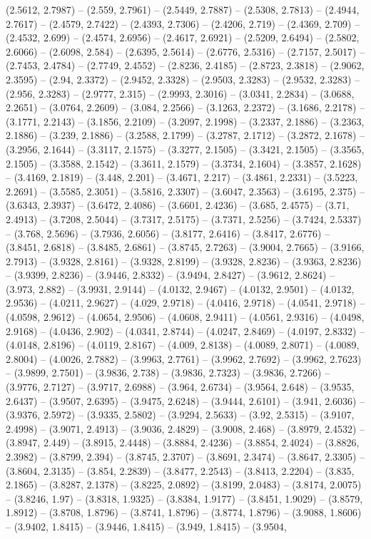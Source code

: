 (2.5612, 2.7987) -- (2.559, 2.7961) -- (2.5449, 2.7887) -- (2.5308, 2.7813) -- (2.4944, 2.7617) -- (2.4579, 2.7422) -- (2.4393, 2.7306) -- (2.4206, 2.719) -- (2.4369, 2.709) -- (2.4532, 2.699) -- (2.4574, 2.6956) -- (2.4617, 2.6921) -- (2.5209, 2.6494) -- (2.5802, 2.6066) -- (2.6098, 2.584) -- (2.6395, 2.5614) -- (2.6776, 2.5316) -- (2.7157, 2.5017) -- (2.7453, 2.4784) -- (2.7749, 2.4552) -- (2.8236, 2.4185) -- (2.8723, 2.3818) -- (2.9062, 2.3595) -- (2.94, 2.3372) -- (2.9452, 2.3328) -- (2.9503, 2.3283) -- (2.9532, 2.3283) -- (2.956, 2.3283) -- (2.9777, 2.315) -- (2.9993, 2.3016) -- (3.0341, 2.2834) -- (3.0688, 2.2651) -- (3.0764, 2.2609) -- (3.084, 2.2566) -- (3.1263, 2.2372) -- (3.1686, 2.2178) -- (3.1771, 2.2143) -- (3.1856, 2.2109) -- (3.2097, 2.1998) -- (3.2337, 2.1886) -- (3.2363, 2.1886) -- (3.239, 2.1886) -- (3.2588, 2.1799) -- (3.2787, 2.1712) -- (3.2872, 2.1678) -- (3.2956, 2.1644) -- (3.3117, 2.1575) -- (3.3277, 2.1505) -- (3.3421, 2.1505) -- (3.3565, 2.1505) -- (3.3588, 2.1542) -- (3.3611, 2.1579) -- (3.3734, 2.1604) -- (3.3857, 2.1628) -- (3.4169, 2.1819) -- (3.448, 2.201) -- (3.4671, 2.217) -- (3.4861, 2.2331) -- (3.5223, 2.2691) -- (3.5585, 2.3051) -- (3.5816, 2.3307) -- (3.6047, 2.3563) -- (3.6195, 2.375) -- (3.6343, 2.3937) -- (3.6472, 2.4086) -- (3.6601, 2.4236) -- (3.685, 2.4575) -- (3.71, 2.4913) -- (3.7208, 2.5044) -- (3.7317, 2.5175) -- (3.7371, 2.5256) -- (3.7424, 2.5337) -- (3.768, 2.5696) -- (3.7936, 2.6056) -- (3.8177, 2.6416) -- (3.8417, 2.6776) -- (3.8451, 2.6818) -- (3.8485, 2.6861) -- (3.8745, 2.7263) -- (3.9004, 2.7665) -- (3.9166, 2.7913) -- (3.9328, 2.8161) -- (3.9328, 2.8199) -- (3.9328, 2.8236) -- (3.9363, 2.8236) -- (3.9399, 2.8236) -- (3.9446, 2.8332) -- (3.9494, 2.8427) -- (3.9612, 2.8624) -- (3.973, 2.882) -- (3.9931, 2.9144) -- (4.0132, 2.9467) -- (4.0132, 2.9501) -- (4.0132, 2.9536) -- (4.0211, 2.9627) -- (4.029, 2.9718) -- (4.0416, 2.9718) -- (4.0541, 2.9718) -- (4.0598, 2.9612) -- (4.0654, 2.9506) -- (4.0608, 2.9411) -- (4.0561, 2.9316) -- (4.0498, 2.9168) -- (4.0436, 2.902) -- (4.0341, 2.8744) -- (4.0247, 2.8469) -- (4.0197, 2.8332) -- (4.0148, 2.8196) -- (4.0119, 2.8167) -- (4.009, 2.8138) -- (4.0089, 2.8071) -- (4.0089, 2.8004) -- (4.0026, 2.7882) -- (3.9963, 2.7761) -- (3.9962, 2.7692) -- (3.9962, 2.7623) -- (3.9899, 2.7501) -- (3.9836, 2.738) -- (3.9836, 2.7323) -- (3.9836, 2.7266) -- (3.9776, 2.7127) -- (3.9717, 2.6988) -- (3.964, 2.6734) -- (3.9564, 2.648) -- (3.9535, 2.6437) -- (3.9507, 2.6395) -- (3.9475, 2.6248) -- (3.9444, 2.6101) -- (3.941, 2.6036) -- (3.9376, 2.5972) -- (3.9335, 2.5802) -- (3.9294, 2.5633) -- (3.92, 2.5315) -- (3.9107, 2.4998) -- (3.9071, 2.4913) -- (3.9036, 2.4829) -- (3.9008, 2.468) -- (3.8979, 2.4532) -- (3.8947, 2.449) -- (3.8915, 2.4448) -- (3.8884, 2.4236) -- (3.8854, 2.4024) -- (3.8826, 2.3982) -- (3.8799, 2.394) -- (3.8745, 2.3707) -- (3.8691, 2.3474) -- (3.8647, 2.3305) -- (3.8604, 2.3135) -- (3.854, 2.2839) -- (3.8477, 2.2543) -- (3.8413, 2.2204) -- (3.835, 2.1865) -- (3.8287, 2.1378) -- (3.8225, 2.0892) -- (3.8199, 2.0483) -- (3.8174, 2.0075) -- (3.8246, 1.97) -- (3.8318, 1.9325) -- (3.8384, 1.9177) -- (3.8451, 1.9029) -- (3.8579, 1.8912) -- (3.8708, 1.8796) -- (3.8741, 1.8796) -- (3.8774, 1.8796) -- (3.9088, 1.8606) -- (3.9402, 1.8415) -- (3.9446, 1.8415) -- (3.949, 1.8415) -- (3.9504, 